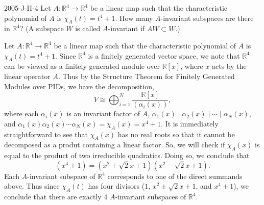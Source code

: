 \documentclass{article}
\begin{document}
	
	\begin{prb}{2005-J-II-4}
		Let $A: \mathbb{R}^{4} \to \mathbb{R}^{4}$ be a linear map such that the characteristic polynomial of $A$ is $\chi_{A}(t) = t^{4} + 1$. How many $A$-invariant subspaces are there in $\mathbb{R}^{4}$? (A subspace $W$ is called $A$-invariant if $AW \subset W$.) 
	\end{prb}
	Let $A: \mathbb{R}^{4} \to \mathbb{R}^{4}$ be a linear map such that the characteristic polynomial of $A$ is $\chi_{A}(t) = t^{4} + 1$. Since $\mathbb{R}^{4}$ is a finitely generated vector space, we note that $\mathbb{R}^{4}$ can be viewed as a finitely generated module over $\mathbb{R}[x]$, where $x$ acts by the linear operator $A$. Thus by the Structure Theorem for Finitely Generated Modules over PIDs, we have the decomposition, 
	\begin{equation*}
		V \cong \bigoplus_{i = 1}^{N}\frac{\mathbb{R}[x]}{(\alpha_{i}(x))}, 
	\end{equation*}
	where each $\alpha_{i}(x)$ is an invariant factor of $A$, $\alpha_{1}(x) \mid \alpha_{2}(x) \mid \dotsm \mid \alpha_{N}(x)$, and $\alpha_{1}(x)\alpha_{2}(x)\dotsm \alpha_{N}(x) = \chi_{A}(x) = x^{4} + 1$. It is immediately straightforward to see that $\chi_{A}(x)$ has no real roots so that it cannot be decomposed as a produt containing a linear factor. So, we will check if $\chi_{A}(x)$ is equal to the product of two irreducible quadratics. Doing so, we conclude that 
	\begin{equation*}
		(x^{4} + 1) = (x^{2} + \sqrt{2} x + 1)(x^{2} - \sqrt{2}x + 1). 
	\end{equation*}
	Each $A$-invariant subspace of $\mathbb{R}^{4}$ corresponds to one of the direct summands above. Thus since $\chi_{A}(t)$ has four divisors ($1$, $x^{2} \pm \sqrt{2} x + 1$, and $x^{4} + 1$), we conclude that there are exactly $4$ $A$-invariant subspaces of $\mathbb{R}^{4}$. 
	
\end{document}
